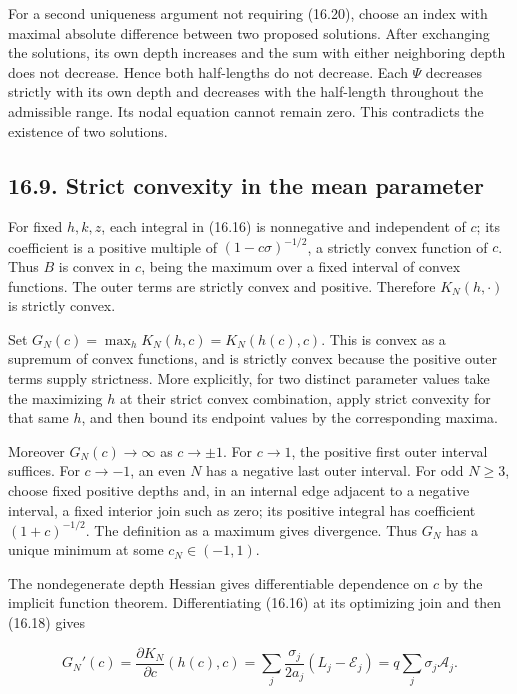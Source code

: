 \documentclass[11pt]{article}
\begin{document}
For a second uniqueness argument not requiring (16.20), choose an index
with maximal absolute difference between two proposed solutions. After
exchanging the solutions, its own depth increases and the sum with
either neighboring depth does not decrease. Hence both half-lengths do
not decrease. Each \(\Psi\) decreases strictly with its own depth and
decreases with the half-length throughout the admissible range. Its
nodal equation cannot remain zero. This contradicts the existence of two
solutions.

\subsection{16.9. Strict convexity in the mean
parameter}\label{strict-convexity-in-the-mean-parameter}

For fixed \(h,k,z\), each integral in (16.16) is nonnegative and
independent of \(c\); its coefficient is a positive multiple of
\((1-c\sigma)^{-1/2}\), a strictly convex function of \(c\). Thus \(B\)
is convex in \(c\), being the maximum over a fixed interval of convex
functions. The outer terms are strictly convex and positive. Therefore
\(K_N(h,\cdot)\) is strictly convex.

Set \(G_N(c)=\max_h K_N(h,c)=K_N(h(c),c)\). This is convex as a supremum
of convex functions, and is strictly convex because the positive outer
terms supply strictness. More explicitly, for two distinct parameter
values take the maximizing \(h\) at their strict convex combination,
apply strict convexity for that same \(h\), and then bound its endpoint
values by the corresponding maxima.

Moreover \(G_N(c)\to\infty\) as \(c\to\pm1\). For \(c\to1\), the
positive first outer interval suffices. For \(c\to-1\), an even \(N\)
has a negative last outer interval. For odd \(N\ge3\), choose fixed
positive depths and, in an internal edge adjacent to a negative
interval, a fixed interior join such as zero; its positive integral has
coefficient \((1+c)^{-1/2}\). The definition as a maximum gives
divergence. Thus \(G_N\) has a unique minimum at some \(c_N\in(-1,1)\).

The nondegenerate depth Hessian gives differentiable dependence on \(c\)
by the implicit function theorem. Differentiating (16.16) at its
optimizing join and then (16.18) gives

\[
G_N'(c)=\frac{\partial K_N}{\partial c}(h(c),c)
=\sum_j\frac{\sigma_j}{2a_j}(L_j-\mathcal E_j)
=q\sum_j\sigma_j\mathcal A_j.
\tag{16.21}
\]
\end{document}
